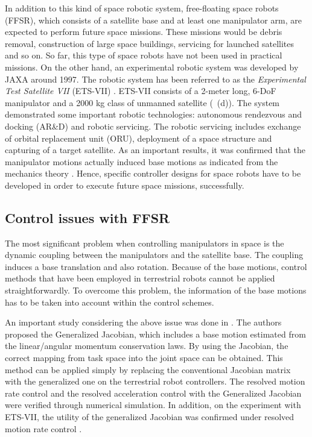 In addition to this kind of space robotic system,
free-floating space robots (FFSR), which consists of a satellite base and at least one manipulator arm,
are expected to perform future space missions.
These missions would be debris removal, construction of large space buildings,
servicing for launched satellites and so on.
So far, this type of space robots have not been used in practical missions.
On the other hand,
an experimental robotic system was developed by JAXA around 1997.
The robotic system has been referred to as the \textit{Experimental Test Satellite VII} (ETS-VII) \cite{Oda1997}.
ETS-VII consists of a 2-meter long, 6-DoF manipulator and a 2000 kg class of unmanned satellite (~(d)).
The system demonstrated some important robotic technologies:
autonomous rendezvous and docking (AR\&D) and robotic servicing.
The robotic servicing includes exchange of orbital replacement unit (ORU),
deployment of a space structure and capturing of a target satellite.
As an important results,
it was confirmed that the manipulator motions actually induced base motions
as indicated from the mechanics theory \cite{SPACEROBOT,Masutani,Yoshida2003}.
Hence, specific controller designs for space robots
have to be developed in order to execute future space missions, successfully.

\subsection{Control issues with FFSR}
The most significant problem when controlling manipulators in space
is the dynamic coupling between the manipulators and the satellite base.
The coupling induces a base translation and also rotation.
Because of the base motions,
control methods that have been employed in terrestrial robots cannot be applied straightforwardly.
To overcome this problem,
the information of the base motions has to be taken into account within the control schemes.

An important study considering the above issue was done in \cite{Masutani,Umetani1989}.
The authors proposed the Generalized Jacobian,
which includes a base motion estimated from the linear/angular momentum conservation laws.
By using the Jacobian,
the correct mapping from task space into the joint space can be obtained.
This method can be applied simply by replacing the conventional Jacobian matrix with the generalized one
on the terrestrial robot controllers.
The resolved motion rate control and the resolved acceleration control with the Generalized Jacobian were verified
through numerical simulation.
In addition,
on the experiment with ETS-VII,
the utility of the generalized Jacobian was
confirmed under resolved motion rate control \cite{Yoshida2003}.

